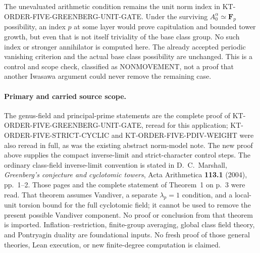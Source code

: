 The unevaluated arithmetic condition remains the unit norm index
in KT-ORDER-FIVE-GREENBERG-UNIT-GATE.  Under the surviving
$A_0^\alpha\simeq\mathbf F_p$ possibility, an index $p$ at some
layer would prove capitulation and bounded tower growth, but even
that is not itself triviality of the base class group.  No such
index or stronger annihilator is computed here.  The already
accepted periodic vanishing criterion and the actual base class
possibility are unchanged.  This is a control and scope check,
classified as NONMOVEMENT, not a proof that another Iwasawa
argument could never remove the remaining case.

\paragraph{Primary and carried source scope.}
The genus-field and principal-prime statements are the complete
proof of KT-ORDER-FIVE-GREENBERG-UNIT-GATE, reread for this
application; KT-ORDER-FIVE-STRICT-CYCLIC and
KT-ORDER-FIVE-PDIV-WEIGHT were also reread in full, as was the
existing abstract norm-model note.  The new proof above supplies
the compact inverse-limit and strict-character control steps.
The ordinary class-field inverse-limit convention is stated in
D.~C.~Marshall, \emph{Greenberg's conjecture and cyclotomic towers},
Acta Arithmetica \textbf{113.1} (2004), pp.~1--2.
Those pages and the complete statement of Theorem~1 on p.~3 were
read.  That theorem assumes Vandiver, a separate $\lambda_p=1$
condition, and a local-unit torsion bound for the full cyclotomic
field; it cannot be used to remove the present possible Vandiver
component.  No proof or conclusion from that theorem is imported.
Inflation--restriction, finite-group averaging, global class
field theory, and Pontryagin duality are foundational inputs.
No fresh proof of those general theories, Lean execution, or
new finite-degree computation is claimed.
